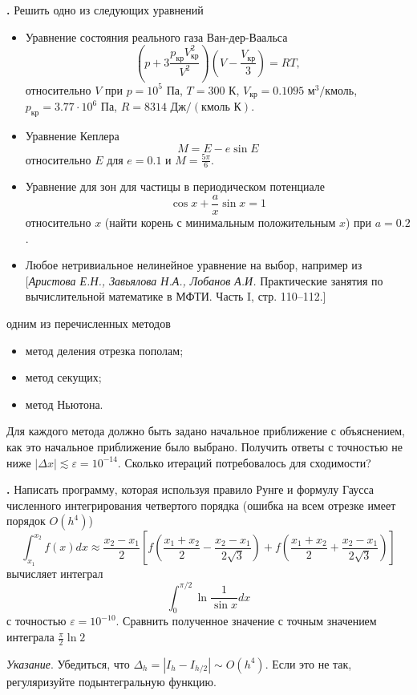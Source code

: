 \documentclass[12pt]{article}
\newcounter{task}
\newcommand{\problem}{\par\textbf{\stepcounter{task}\thetask. }}
\begin{document}
\problem Решить одно из следующих уравнений
\begin{itemize}
\item Уравнение состояния реального газа Ван-дер-Ваальса
\[
\left(p + 3\frac{p_\text{кр}V_\text{кр}^2}{V^2}\right) \left(V - \frac{V_\text{кр}}{3}\right) = RT,
\]
относительно $V$ при $p = 10^5 \text{ Па}$, $T = 300\text{ К}$, $V_\text{кр} =
0.1095 \text{ м}^3 / \text{кмоль}$,
$p_\text{кр} = 3.77\cdot 10^6 \text{ Па}$, $R = 8314 \text{ Дж} / (\text{кмоль
К})$.

\item Уравнение Кеплера
\[
M = E - e \sin E
\]
относительно $E$ для $e = 0.1$ и $M = \frac{5\pi}{6}$.

\item Уравнение для зон для частицы в периодическом потенциале
\[
\cos x + \frac{a}{x} \sin x = 1
\]
относительно $x$ (найти корень с минимальным положительным $x$) при $a = 0.2$.

\item Любое нетривиальное нелинейное уравнение на выбор, например из
[\textit{Аристова Е.Н., Завьялова Н.А., Лобанов А.И.} Практические занятия по
вычислительной математике в МФТИ. Часть I, стр. 110--112.]
\end{itemize}
одним из перечисленных методов
\begin{itemize}
\item метод деления отрезка пополам;
\item метод секущих;
\item метод Ньютона.
\end{itemize}

Для каждого метода должно быть задано начальное приближение с объяснением, как
это начальное приближение было выбрано. Получить ответы с точностью не ниже
$|\Delta x| \lesssim \varepsilon = 10^{-14}$. Сколько итераций потребовалось для
сходимости?

\problem Написать программу, которая используя правило Рунге и формулу
Гаусса численного интегрирования четвертого порядка (ошибка на всем
отрезке имеет порядок $O(h^4)$)
\[
\int_{x_1}^{x_2} f(x) dx \approx \frac{x_2 - x_1}{2}\left[
f\left(\frac{x_1+x_2}{2} - \frac{x_2 - x_1}{2\sqrt{3}}\right) +
f\left(\frac{x_1+x_2}{2} + \frac{x_2 - x_1}{2\sqrt{3}}\right)
\right]
\]
вычисляет интеграл
\[
\int_0^{\pi/2} \ln \frac{1}{\sin x} dx
\]
с точностью $\varepsilon = 10^{-10}$. Сравнить полученное значение с точным
значением интеграла $\frac{\pi}{2} \ln 2$

\emph{Указание}. Убедиться, что $\Delta_h = |I_h - I_{h/2}| \sim O(h^4)$. Если это
не так, регуляризуйте подынтегральную функцию.
\end{document}

